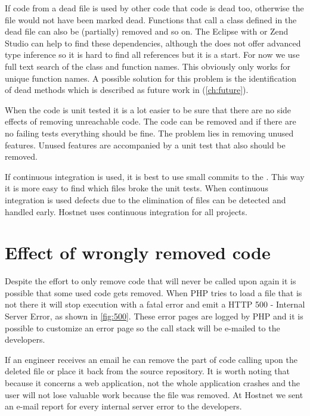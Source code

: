 If code from a dead file is used by other code that code is dead too, otherwise the file would not have been marked dead. Functions that call a class defined in the dead file can also be (partially) removed and so on. The Eclipse \ide with \pdt or Zend Studio can help to find these dependencies, although the \dltk does not offer advanced type inference so it is hard to find all references but it is a start. For now we use full text search of the class and function names. This obviously only works for unique function names. A possible solution for this problem is the identification of dead methods which is described as future work in (\autoref{ch:future}).

When the code is unit tested it is a lot easier to be sure that there are no side effects of removing unreachable code. The code can be removed and if there are no failing tests everything should be fine. The problem lies in removing unused features. Unused features are accompanied by a unit test that also should be removed. 

If continuous integration\cite{fowler2006} is used, it is best to use small commits to the \vcs. This way it is more easy to find which files broke the unit tests. When continuous integration is used defects due to the elimination of files can be detected and handled early. Hostnet uses continuous integration for all projects. 

\section{Effect of wrongly removed code} 


Despite the effort to only remove code that will never be called upon again it is possible that some used code gets removed. When PHP tries to load a file that is not there it will stop execution with a fatal error and emit a HTTP 500 - Internal Server Error, as shown in \autoref{fig:500}. These error pages are logged by PHP and it is possible to customize an error page so the call stack will be e-mailed to the developers. 

If an engineer receives an email he can remove the part of code calling upon the deleted file or place it back from the source repository. It is worth noting that because it concerns a web application, not the whole application crashes and the user will not lose valuable work because the file was removed. At Hostnet we sent an e-mail report for every internal server error to the developers.

